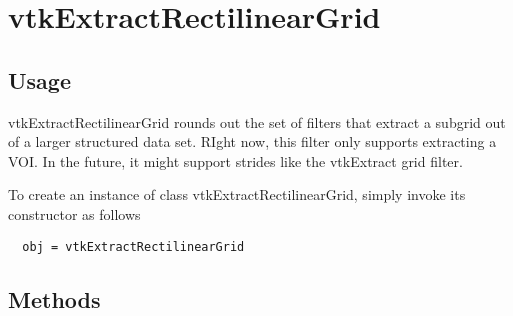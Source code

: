\section{vtkExtractRectilinearGrid}

\subsection{Usage}

 vtkExtractRectilinearGrid rounds out the set of filters that extract
 a subgrid out of a larger structured data set.  RIght now, this filter
 only supports extracting a VOI.  In the future, it might support
 strides like the vtkExtract grid filter.

To create an instance of class vtkExtractRectilinearGrid, simply
invoke its constructor as follows
\begin{verbatim}
  obj = vtkExtractRectilinearGrid
\end{verbatim}
\subsection{Methods}

